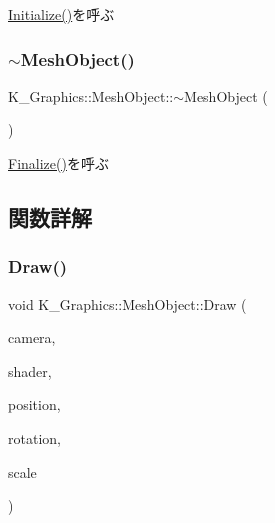 \mbox{\hyperlink{class_k___graphics_1_1_mesh_object_a248233630419973244851f5d2070b5aa}{Initialize()}}を呼ぶ 

\mbox{\label{class_k___graphics_1_1_mesh_object_ae8c3f648521b8c14da19fa53fe1656f3}} 
\subsubsection{\texorpdfstring{$\sim$\+Mesh\+Object()}{~MeshObject()}}
{\footnotesize\ttfamily K\+\_\+\+Graphics\+::\+Mesh\+Object\+::$\sim$\+Mesh\+Object (\begin{DoxyParamCaption}{ }\end{DoxyParamCaption})}



\mbox{\hyperlink{class_k___graphics_1_1_mesh_object_a2d7f1695e98aeba276e2f61b0bca00ab}{Finalize()}}を呼ぶ 



\subsection{関数詳解}
\mbox{\label{class_k___graphics_1_1_mesh_object_a86437d928a10a4ceaa0ccdb1ed174028}} 
\subsubsection{\texorpdfstring{Draw()}{Draw()}}
{\footnotesize\ttfamily void K\+\_\+\+Graphics\+::\+Mesh\+Object\+::\+Draw (\begin{DoxyParamCaption}\item[{\mbox{\hyperlink{class_k___graphics_1_1_camera_class}{Camera\+Class}} $\ast$}]{camera,  }\item[{\mbox{\hyperlink{class_k___graphics_1_1_shader_class}{Shader\+Class}} $\ast$}]{shader,  }\item[{const \mbox{\hyperlink{namespace_k___math_a66884d78082c39ada4091c211f3570f8}{K\+\_\+\+Math\+::\+Vector3}} \&}]{position,  }\item[{const \mbox{\hyperlink{namespace_k___math_a66884d78082c39ada4091c211f3570f8}{K\+\_\+\+Math\+::\+Vector3}} \&}]{rotation,  }\item[{const \mbox{\hyperlink{namespace_k___math_a66884d78082c39ada4091c211f3570f8}{K\+\_\+\+Math\+::\+Vector3}} \&}]{scale }\end{DoxyParamCaption})}



